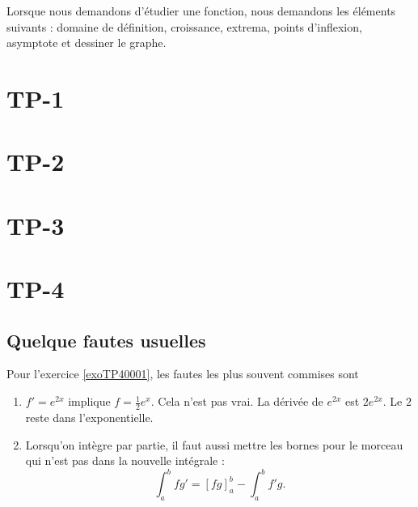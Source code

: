 Lorsque nous demandons d'étudier une fonction, nous demandons les éléments suivants : domaine de définition, croissance, extrema, points d'inflexion, asymptote et dessiner le graphe.

\section{TP-1}
\section{TP-2}
\section{TP-3}





\section{TP-4}



\subsection{Quelque fautes usuelles}

Pour l'exercice \ref{exoTP40001}, les fautes les plus souvent commises sont
\begin{enumerate}

	\item
		$f'= e^{2x}$ implique $f=\frac{1}{ 2 } e^{x}$. Cela n'est pas vrai. La dérivée de $ e^{2x}$ est $2 e^{2x}$. Le $2$ reste dans l'exponentielle.

	\item
		Lorsqu'on intègre par partie, il faut aussi mettre les bornes pour le morceau qui n'est pas dans la nouvelle intégrale :
		\begin{equation}
			\int_a^b fg'=[fg]_a^b-\int_a^bf'g.
		\end{equation}
\end{enumerate}

